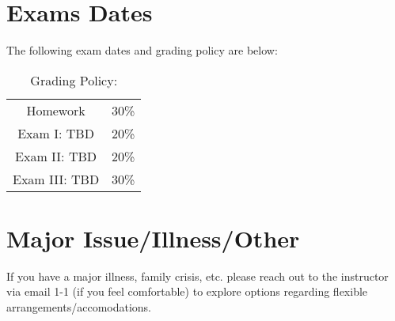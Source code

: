\documentclass[11pt]{article}
\begin{document}
\section{Exams Dates} 
The following exam dates and grading policy are below:

\begin{table}[h!]
\caption{Grading Policy:}
\begin{center}
\begin{tabular}{cc}
Homework &30\%\\
Exam I:  TBD &20\%\\
Exam  II: TBD & 20\%\\
Exam III:  TBD & 30\%\\
\end{tabular}
\end{center}
\label{default}
\end{table}%

\section{Major Issue/Illness/Other}

If you have a major illness, family crisis, etc. please reach out to the instructor via email 1-1 (if you feel comfortable) to explore options regarding flexible arrangements/accomodations.
\end{document}
